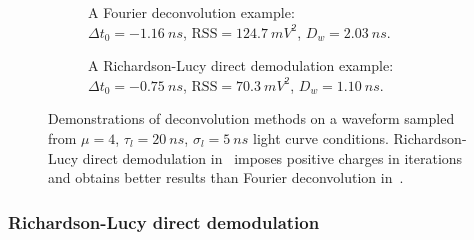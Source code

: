 \begin{figure}[H]
  \begin{subfigure}{0.5\textwidth}
    \centering
    \resizebox{\textwidth}{!}{}
    \caption{\label{fig:fd} A Fourier deconvolution example: \\ $\Delta t_0=\SI{-1.16}{ns}$, $\mathrm{RSS}=\SI{124.7}{mV^2}$, $D_w=\SI{2.03}{ns}$.}
  \end{subfigure}
  \begin{subfigure}{0.5\textwidth}
    \centering
    \resizebox{\textwidth}{!}{}
    \caption{\label{fig:lucy} A Richardson-Lucy direct demodulation example:\\ $\Delta t_0=\SI{-0.75}{ns}$, $\mathrm{RSS}=\SI{70.3}{mV^2}$, $D_w=\SI{1.10}{ns}$.}
  \end{subfigure}
  \caption{Demonstrations of deconvolution methods on a waveform sampled from $\mu=4$, $\tau_l=\SI{20}{ns}$, $\sigma_l=\SI{5}{ns}$ light curve conditions. Richardson-Lucy direct demodulation in~ imposes positive charges in iterations and obtains better results than Fourier deconvolution in~.}
\end{figure}

\subsubsection{Richardson-Lucy direct demodulation}

